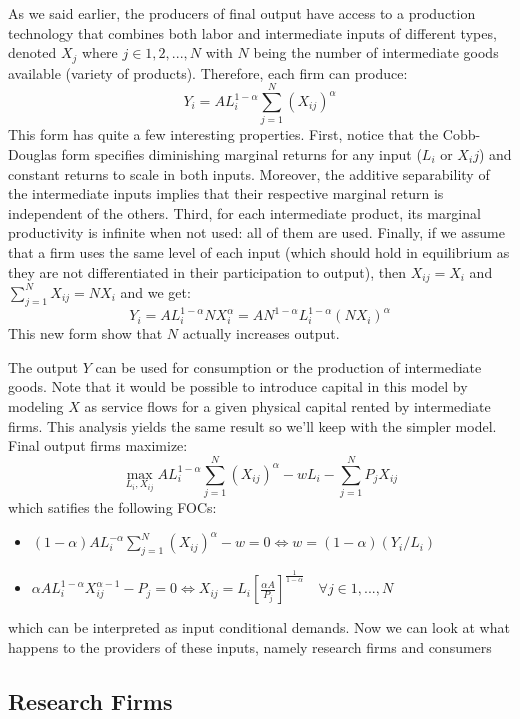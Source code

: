 \documentclass[12pt]{report}
\begin{document}
As we said earlier, the producers of final output have access to a production technology that combines both labor and intermediate inputs of different types, denoted $X_j$ where $j\in 1, 2, ..., N$ with $N$ being the number of intermediate goods available (variety of products). Therefore, each firm can produce: $$ Y_i = AL_i^{1-\alpha}\sum_{j=1}^{N}(X_{ij})^\alpha $$ This form has quite a few interesting properties. First, notice that the Cobb-Douglas form specifies diminishing marginal returns for any input ($L_i$ or $X_ij$) and constant returns to scale in both inputs. Moreover, the additive separability of the intermediate inputs implies that their respective marginal return is independent of the others. Third, for each intermediate product, its marginal productivity is infinite when not used: all of them are used. Finally, if we assume that a firm uses the same level of each input (which should hold in equilibrium  as they are not differentiated in their participation to output), then $X_{ij} = X_i$ and $\sum_{j=1}^{N} X_{ij} = NX_i$ and we get: $$Y_i = AL_i^{1 -\alpha} NX_i^\alpha = AN^{1 -\alpha}L_i^{1 -\alpha} (NX_i)^\alpha$$ This new form show that $N$ actually increases output.

The output $Y$ can be used for consumption or the production of intermediate goods. Note that it would be possible to introduce capital in this model by modeling $X$ as service flows for a given physical capital rented by intermediate firms. This analysis yields the same result so we'll keep with the simpler model. Final output firms maximize: $$\max_{L_i, X_{ij}} AL_i^{1-\alpha}\sum_{j=1}^{N}(X_{ij})^\alpha - wL_i - \sum_{j=1}^{N}P_jX_{ij} $$ which satifies the following FOCs:\begin{itemize}
\item $(1-\alpha) AL_i^{-\alpha}\sum_{j=1}^{N}(X_{ij})^\alpha - w = 0 \Leftrightarrow w = (1-\alpha)(Y_i/L_i) $
\item $\alpha A L_i^{1-\alpha} X_{ij}^{\alpha - 1} - P_j = 0 \Leftrightarrow X_{ij} = L_i \left[\frac{\alpha A}{P_j}\right]^{\frac{1}{1-\alpha}}\quad \forall j\in 1, ..., N $
\end{itemize} which can be interpreted as input conditional demands. Now we can look at what happens to the providers of these inputs, namely research firms and consumers

\subsection{Research Firms}
\end{document}

